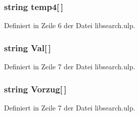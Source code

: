 \subsubsection[{temp4}]{\setlength{\rightskip}{0pt plus 5cm}string temp4\mbox{[}$\,$\mbox{]}}\label{libsearch_8ulp_ad6a0fc9c82629f46ca764b920e57db24}


Definiert in Zeile 6 der Datei libsearch.\+ulp.

\hypertarget{libsearch_8ulp_a088204f20433deace071409889b5aba1}{}
\subsubsection[{Val}]{\setlength{\rightskip}{0pt plus 5cm}string Val\mbox{[}$\,$\mbox{]}}\label{libsearch_8ulp_a088204f20433deace071409889b5aba1}


Definiert in Zeile 7 der Datei libsearch.\+ulp.

\hypertarget{libsearch_8ulp_a773ea3bd03d30f9371dda8ee12a97b3a}{}
\subsubsection[{Vorzug}]{\setlength{\rightskip}{0pt plus 5cm}string Vorzug\mbox{[}$\,$\mbox{]}}\label{libsearch_8ulp_a773ea3bd03d30f9371dda8ee12a97b3a}


Definiert in Zeile 7 der Datei libsearch.\+ulp.

